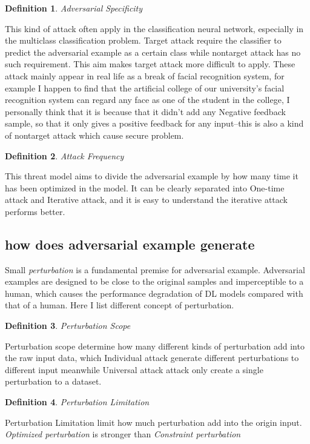\documentclass[twoside,twocolumn]{article}
\newtheorem{definition}{Definition}
\begin{document}
\begin{definition}
	Adversarial Specificity
\end{definition}
This kind of attack often apply in the classification neural network, especially in the multiclass classification problem. Target attack require the classifier to predict the adversarial example as a certain class while nontarget attack has no such requirement. This aim makes target attack more difficult to apply. These attack mainly appear in real life as a break of facial recognition system, for example I happen to find that the artificial college of our university's facial recognition system can regard any face as one of the student in the college, I personally think that it is because that it didn't add any Negative feedback sample, so that it only gives a positive feedback for any input--this is also a kind of nontarget attack which cause secure problem.

\begin{definition}
	Attack Frequency
\end{definition}
This threat model aims to divide the adversarial example by how many time it has been optimized in the model. It can be clearly separated into One-time attack and Iterative attack, and it is easy to understand the iterative attack performs better.

\subsection{how does adversarial example generate}
Small \emph{perturbation} is a fundamental premise for adversarial example. Adversarial examples are designed to be close to the original samples and imperceptible to a human, which causes the performance degradation of DL models compared with that of a human. Here I list different concept of  perturbation.

\begin{definition}
	Perturbation Scope
\end{definition}
Perturbation scope determine how many different kinds of perturbation add into the raw input data, which Individual attack generate different perturbations to different input meanwhile Universal attack attack only create a single perturbation to a dataset.

\begin{definition}
	Perturbation Limitation
\end{definition}
Perturbation Limitation limit how much perturbation add into the origin input. \emph{Optimized perturbation} is stronger than \emph{Constraint perturbation}
\end{document}
